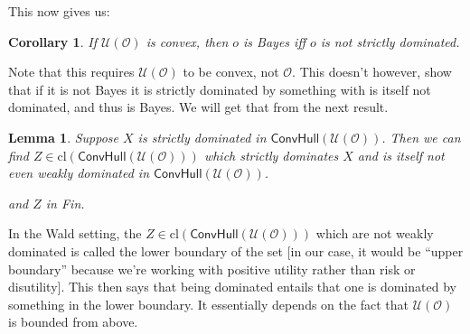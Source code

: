 \documentclass[a4paper]{article}
\newtheorem{lemma}[theorem]{Lemma}
\newtheorem{corollary}[theorem]{Corollary}
\newcommand\cl{\mathrm{cl}}
\renewcommand\O{\mathcal{O}}
\newcommand\Uwald{\mathcal{U}} %
\newcommand{\Conv}{\mathsf{ConvHull}}
\newenvironment{CCM rewritten}
{\begingroup\color{blue}} %
{\endgroup}              %
\begin{document}
		This now gives us:
	\begin{corollary}
		If $\Uwald(\O)$ is convex, then 
		$o$ is Bayes iff $o$ is not strictly dominated.
	\end{corollary}
	Note that this requires $\Uwald(\O)$ to be convex, not $\O$. This doesn't however, show that if it is not Bayes it is strictly dominated by something with is itself not dominated, and thus is Bayes. We will get that from the next result. 
	
	
	\begin{lemma}\label{thm:cct:dominator on boundry}
		Suppose $X$ is strictly  dominated in $\Conv(\Uwald(\O))$. Then we can find $Z\in\cl(\Conv(\Uwald(\O)))$ which strictly dominates $X$ and is itself not even weakly dominated in $\Conv(\Uwald(\O))$. \begin{infversion}
			and $Z$ in Fin.
		\end{infversion}
	\end{lemma}
	In the Wald setting, the $Z\in\cl(\Conv(\Uwald(\O)))$ which are not weakly dominated is called the lower boundary of the set [in our case, it would be ``upper boundary'' because we're working with positive utility rather than risk or disutility]. This then says that being dominated entails that one is dominated by something in the lower boundary. It essentially depends on the fact that $\Uwald(\O)$ is bounded from above. 
	
\end{document}
